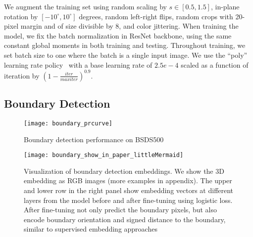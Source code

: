 We augment the training set using random scaling by $s\in [0.5, 1.5]$, in-plane
rotation by $[-10^\circ,10^\circ]$ degrees, random left-right flips, random
crops with 20-pixel margin and of size divisible by 8, and color jittering.
When training the model, we fix the batch normalization in ResNet backbone,
using the same constant global moments in both training and testing.
Throughout training, we set batch size to one where the batch is a single input
image.
We use the ``poly'' learning rate policy~\cite{chen2016deeplab} with a base
learning rate of $2.5e-4$ scaled as a function of iteration by
$(1-\frac{iter}{maxiter})^{0.9}$.  



\subsection{Boundary Detection}

\begin{figure}[t]
\centering
   \texttt{[image: boundary\_prcurve]}
   \vspace{-2mm}
   \caption{Boundary detection performance on BSDS500}
\label{fig:boundary_prcurve}
\vspace{-3mm}
\end{figure}

\begin{figure}[t]
\centering
   \texttt{[image: boundary\_show\_in\_paper\_littleMermaid]}
\vspace{-5mm}
   \caption{
   Visualization of boundary detection embeddings.  We show the 3D embedding as
   RGB images (more examples in appendix).  The upper and lower row in the
   right panel show embedding vectors at different layers from the model before
   and after fine-tuning using logistic loss.  After fine-tuning not only
   predict the boundary pixels, but also encode boundary orientation and signed
   distance to the boundary, similar to supervised embedding approaches
   \cite{sironi2014multiscale,uhrig2016pixel,bai2016deep}
   }
\label{fig:boundary_show_in_paper}
\vspace{-2mm}
\end{figure}


